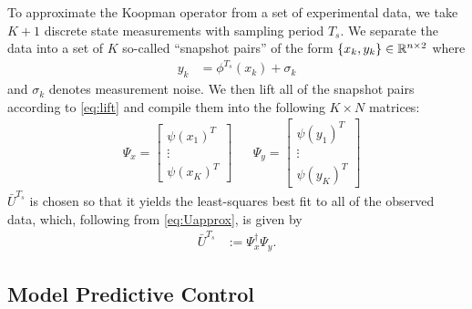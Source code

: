 To approximate the Koopman operator from a set of experimental data, we take $K+1$ discrete state measurements with sampling period $T_s$. We separate the data into a set of $K$ so-called ``snapshot pairs'' of the form ${ \{ x_k , y_k \} \in \mathbb{R}^{n \times 2} }$ where
\begin{align}
    y_{k} &= \phi^{T_s} (x_k) + \sigma_k
\end{align}
and $\sigma_k$ denotes measurement noise.
We then lift all of the snapshot pairs according to \eqref{eq:lift} and compile them into the following ${K \times N}$ matrices:
\begin{align}
    &\Psi_x = \begin{bmatrix} {\psi}(x_1)^T \\ \vdots \\  {\psi}(x_K)^T \end{bmatrix}
    &&\Psi_y = \begin{bmatrix} {\psi}(y_1)^T \\ \vdots \\  {\psi}(y_K)^T \end{bmatrix}
\end{align}
$\bar{U}^{T_s}$ is chosen so that it yields the least-squares best fit to all of the observed data, which, following from \eqref{eq:Uapprox}, is given by 
\begin{align}
    \bar{U}^{T_s} &:= \Psi_x^\dagger \Psi_y.
\end{align}

\subsection{Model Predictive Control}


